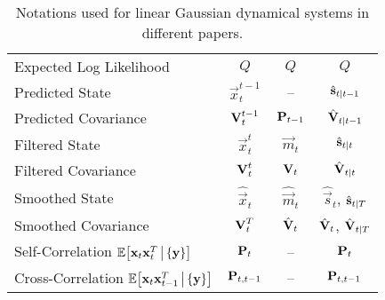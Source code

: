 \begin{table}[ht]
\begin{tabular}{l|ccc}
				Expected Log Likelihood      & \( Q \)                         & \( Q \)                 & \( Q \)                                                    \\
				Predicted State              & \( \vec{x}_t^{t - 1} \)         & --                      & \( \hat{\boldsymbol{\mathrm{s}}}_{t \vert t - 1} \)                    \\
				Predicted Covariance         & \( \boldsymbol{\mathrm{V}}_t^{t - 1} \)         & \( \boldsymbol{\mathrm{P}}_{t - 1} \)   & \( \hat{\boldsymbol{\mathrm{V}}}_{t \vert t - 1} \)                    \\
				Filtered State               & \( \vec{x}_t^t \)               & \( \vec{m}_t \)         & \( \hat{\boldsymbol{\mathrm{s}}}_{t \vert t} \)                        \\
				Filtered Covariance          & \( \boldsymbol{\mathrm{V}}_t^t \)               & \( \boldsymbol{\mathrm{V}}_t \)         & \( \hat{\boldsymbol{\mathrm{V}}}_{t \vert t} \)                        \\
				Smoothed State               & \( \hat{\vec{x}}_t \)           & \( \hat{\vec{m}}_t \)   & \( \hat{\vec{s}}_t \), \( \hat{\boldsymbol{\mathrm{s}}}_{t \vert T} \) \\
				Smoothed Covariance          & \( \boldsymbol{\mathrm{V}}_t^T \)               & \( \hat{\boldsymbol{\mathrm{V}}}_t \)   & \( \hat{\boldsymbol{\mathrm{V}}}_t \), \( \hat{\boldsymbol{\mathrm{V}}}_{t \vert T} \) \\
				Self-Correlation \( \mathbb{E}\big[\boldsymbol{\mathrm{x}}_t \boldsymbol{\mathrm{x}}_t^T \,\big\vert\, \{ \boldsymbol{\mathrm{y}} \}\big] \)
				                             & \( \boldsymbol{\mathrm{P}}_t \)                 & --                      & \( \boldsymbol{\mathrm{P}}_t \)                                            \\
				Cross-Correlation \( \mathbb{E}\big[\boldsymbol{\mathrm{x}}_t \boldsymbol{\mathrm{x}}_{t-1}^T \,\big\vert\, \{ \boldsymbol{\mathrm{y}} \}\big] \)
				                             & \( \boldsymbol{\mathrm{P}}_{t, t - 1} \)        & --                      & \( \boldsymbol{\mathrm{P}}_{t, t - 1} \)
			\end{tabular}
			\caption{Notations used for linear Gaussian dynamical systems in different papers.}
		\end{table}
